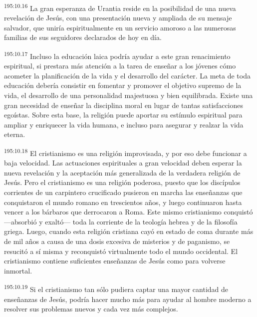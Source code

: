 \par 
\textsuperscript{195:10.16} La gran esperanza de Urantia reside en la posibilidad de una nueva revelación de Jesús, con una presentación nueva y ampliada de su mensaje salvador, que uniría espiritualmente en un servicio amoroso a las numerosas familias de sus seguidores declarados de hoy en día.

\par 
\textsuperscript{195:10.17} Incluso la educación laica podría ayudar a este gran renacimiento espiritual, si prestara más atención a la tarea de enseñar a los jóvenes cómo acometer la planificación de la vida y el desarrollo del carácter. La meta de toda educación debería consistir en fomentar y promover el objetivo supremo de la vida, el desarrollo de una personalidad majestuosa y bien equilibrada. Existe una gran necesidad de enseñar la disciplina moral en lugar de tantas satisfacciones egoístas. Sobre esta base, la religión puede aportar su estímulo espiritual para ampliar y enriquecer la vida humana, e incluso para asegurar y realzar la vida eterna.

\par 
\textsuperscript{195:10.18} El cristianismo es una religión improvisada, y por eso debe funcionar a baja velocidad. Las actuaciones espirituales a gran velocidad deben esperar la nueva revelación y la aceptación más generalizada de la verdadera religión de Jesús. Pero el cristianismo es una religión poderosa, puesto que los discípulos corrientes de un carpintero crucificado pusieron en marcha las enseñanzas que conquistaron el mundo romano en trescientos años, y luego continuaron hasta vencer a los bárbaros que derrocaron a Roma. Este mismo cristianismo conquistó ---absorbió y exaltó--- toda la corriente de la teología hebrea y de la filosofía griega. Luego, cuando esta religión cristiana cayó en estado de coma durante más de mil años a causa de una dosis excesiva de misterios y de paganismo, se resucitó a sí misma y reconquistó virtualmente todo el mundo occidental. El cristianismo contiene suficientes enseñanzas de Jesús como para volverse inmortal.

\par 
\textsuperscript{195:10.19} Si el cristianismo tan sólo pudiera captar una mayor cantidad de enseñanzas de Jesús, podría hacer mucho más para ayudar al hombre moderno a resolver sus problemas nuevos y cada vez más complejos.

